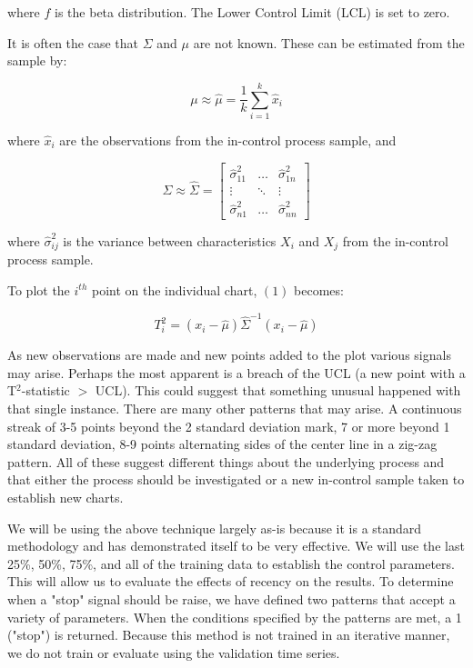 \documentclass[12pt]{article}
\begin{document}
where $f$ is the beta distribution. The Lower Control Limit (LCL)
is set to zero.

It is often the case that $\Sigma$ and $\mu$ are not known. These can be estimated from
the sample by:

\begin{equation}
    \mu \approx \hat{\mu} = \frac{1}{k} \sum_{i=1}^k \hat{x}_i
\end{equation}

where $\hat{x}_i$ are the observations from the in-control process sample, and

\begin{equation}
    \Sigma \approx \hat{\Sigma} = 
    \begin{bmatrix}
        \hat{\sigma}^2_{11} & \dots & \hat{\sigma}^2_{1n} \\
        \vdots & \ddots & \vdots \\
        \hat{\sigma}^2_{n1} & \dots & \hat{\sigma}^2_{nn}
    \end{bmatrix}
\end{equation}

where $\hat{\sigma}^2_{ij}$ is the variance between characteristics $X_i$ and $X_j$ from the 
in-control process sample.

To plot the $i^{th}$ point on the individual chart, $(1)$ becomes:

\begin{equation}
    T_i^{2} = (x_i-\hat{\mu})\hat{\Sigma}^{-1}(x_i-\hat{\mu})
\end{equation}

As new observations are made and new points added to the plot various signals may arise.
Perhaps the most apparent is a breach of the UCL (a new point with a T$^2$-statistic $>$ UCL).
This could suggest that something unusual happened with that single instance. There are many
other patterns that may arise. A continuous streak of 3-5 points beyond the 2 standard deviation
mark, 7 or more beyond 1 standard deviation, 8-9 points alternating sides of the center line in
a zig-zag pattern. All of these suggest different things about the underlying process and that
either the process should be investigated or a new in-control sample taken to establish
new charts.

We will be using the above technique largely as-is because it is a standard methodology and has
demonstrated itself to be very effective. We will use the last 25\%, 50\%, 75\%, and all
of the training data to establish the control parameters. This will allow us to evaluate the
effects of recency on the results. To determine when a "stop" signal should be raise, we have
defined two patterns that accept a variety of parameters. When the conditions specified by the
patterns are met, a 1 ("stop") is returned. Because this method is not trained in an iterative
manner, we do not train or evaluate using the validation time series.
\end{document}
